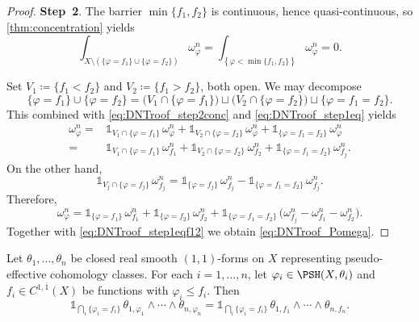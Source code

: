 \begin{proof}
\textbf{Step~2}. The barrier $\min\{f_1,f_2\}$ is continuous, hence quasi-continuous, so \cref{thm:concentration} yields
\begin{equation}\label{eq:DNTroof_step2conc}
\int_{X\setminus \left(\{\varphi=f_1\}\cup\{\varphi=f_2\}\right)}\omega^n_\varphi
=
\int_{\left\{\varphi<\min\{f_1,f_2\}\right\}}\omega^n_\varphi
=0.
\end{equation}

Set $V_1\coloneqq \{f_1<f_2\}$ and $V_2\coloneqq \{f_1>f_2\}$, both open. We may decompose
\[
\{\varphi=f_1\}\cup\{\varphi=f_2\}
=
\bigl(V_1\cap\{\varphi=f_1\}\bigr)
\sqcup
\bigl(V_2\cap\{\varphi=f_2\}\bigr)
\sqcup
\{\varphi=f_1=f_2\}.
\]
This combined with \eqref{eq:DNTroof_step2conc} and \eqref{eq:DNTroof_step1eq} yields
\[
\begin{aligned}
\omega^n_\varphi
={}&
\mathds{1}_{V_1\cap\{\varphi=f_1\}}\,\omega^n_\varphi
+
\mathds{1}_{V_2\cap\{\varphi=f_2\}}\,\omega^n_\varphi
+
\mathds{1}_{\{\varphi=f_1=f_2\}}\,\omega^n_\varphi
\\
={}&
\mathds{1}_{V_1\cap\{\varphi=f_1\}}\,\omega^n_{f_1}
+
\mathds{1}_{V_2\cap\{\varphi=f_2\}}\,\omega^n_{f_2}
+
\mathds{1}_{\{\varphi=f_1=f_2\}}\,\omega^n_{f_j}.
\end{aligned}
\]
On the other hand,
\[
\mathds{1}_{V_j\cap\{\varphi=f_j\}}\,\omega^n_{f_j}
=
\mathds{1}_{\{\varphi=f_j\}}\,\omega^n_{f_j}
-
\mathds{1}_{\{\varphi=f_1=f_2\}}\,\omega^n_{f_j}.
\]
Therefore,
\[
\omega^n_\varphi
=
\mathds{1}_{\{\varphi=f_1\}}\,\omega^n_{f_1}
+
\mathds{1}_{\{\varphi=f_2\}}\,\omega^n_{f_2}
+
\mathds{1}_{\{\varphi=f_1=f_2\}}
\,\bigl(\omega^n_{f_j}-\omega^n_{f_1}-\omega^n_{f_2}\bigr).
\]
Together with \eqref{eq:DNTroof_step1eqf12} we obtain \eqref{eq:DNTroof_Pomega}.
\end{proof}

\begin{theorem}\label{thm:DNTcontact}
Let $\theta_1,\dots,\theta_n$ be closed real smooth $(1,1)$-forms on $X$ representing pseudo-effective cohomology classes. For each $i=1,\dots,n$, let $\varphi_i\in\PSH(X,\theta_i)$ and $f_i\in C^{1,\overline{1}}(X)$ be functions with $\varphi_i\leq f_i$. Then
\begin{equation}\label{eq:DNTcontact}
\mathds{1}_{\bigcap_i\{\varphi_i=f_i\}}\, \theta_{1,\varphi_1}\wedge\cdots\wedge\theta_{n,\varphi_n} = \mathds{1}_{\bigcap_i\{\varphi_i=f_i\}}\, \theta_{1,f_1}\wedge\cdots\wedge\theta_{n,f_n}.
\end{equation}
\end{theorem}

